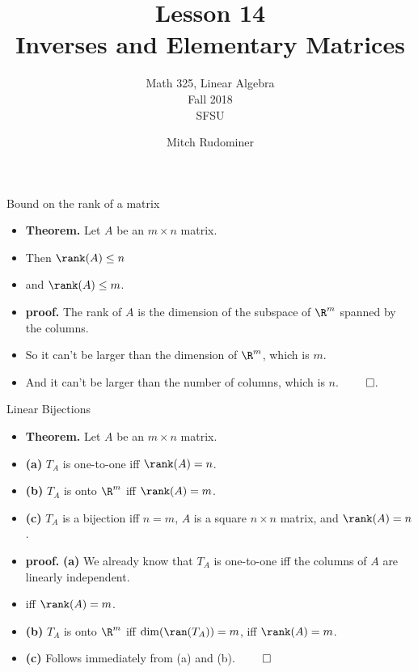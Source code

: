 \documentclass{beamer}
\title{Lesson 14 \\ Inverses and Elementary Matrices}
\subtitle{Math 325, Linear Algebra \\ Fall 2018 \\ SFSU}
\author{Mitch Rudominer}
\date{}
\begin{document}
\begin{frame}
  \titlepage
\end{frame}


\begin{frame}{Bound on the rank of a matrix}

\begin{itemize}
\item \textbf{Theorem.} Let $A$ be an $m\times n$ matrix.
\item Then $\rank(A) \leq n$
\item and $\rank(A) \leq m$.
\item \textbf{proof.} The rank of $A$ is the dimension of the subspace
of $\R^m$  spanned by the columns.
\item So it can't be larger than the dimension of $\R^m$, which is $m$.
\item And it can't be larger than the number of columns, which is $n$. $\qed$.
\end{itemize}
\end{frame}


\begin{frame}{Linear Bijections}

\begin{itemize}
\item \textbf{Theorem.} Let $A$ be an $m\times n$ matrix.
\item \textbf{(a)} $T_A$ is one-to-one iff $\rank(A) = n$.
\item \textbf{(b)} $T_A$ is onto $\R^m$ iff $\rank(A) = m$.
\item \textbf{(c)} $T_A$ is a bijection iff $n=m$, $A$ is a square $n\times n$ matrix, and $\rank(A) = n$.
\item \textbf{proof.} \textbf{(a)} We already know that $T_A$ is one-to-one iff the
columns of $A$ are linearly independent.
\item iff $\rank(A) = m$.
\item \textbf{(b)} $T_A$ is onto $\R^m$ iff $\dim(\ran(T_A)) = m$, iff $\rank(A) = m$.
\item \textbf{(c)} Follows immediately from (a) and (b). $\qed$
\end{itemize}
\end{frame}

\end{document}
